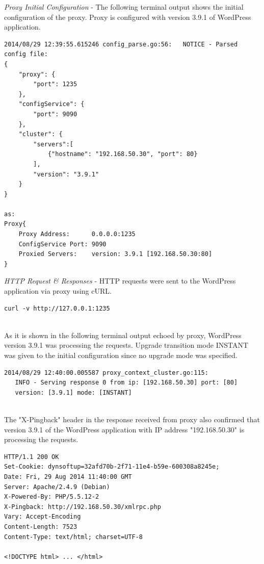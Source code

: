 \documentclass[a4paper,11pt,twoside]{report}
\begin{document}
\noindent
\textit{Proxy Initial Configuration} - The following terminal output shows the initial configuration of the proxy. Proxy is configured with version 3.9.1 of WordPress application.\smallskip

\begin{lstlisting}[language=terminal]
2014/08/29 12:39:55.615246 config_parse.go:56:   NOTICE - Parsed config file:
{
    "proxy": {
        "port": 1235
    },
    "configService": {
        "port": 9090
    },
    "cluster": {
        "servers":[
            {"hostname": "192.168.50.30", "port": 80}
        ],
        "version": "3.9.1"
    }
}

as:
Proxy{
    Proxy Address:      0.0.0.0:1235
    ConfigService Port: 9090
    Proxied Servers:    version: 3.9.1 [192.168.50.30:80]
}
\end{lstlisting}  

\noindent
\textit{HTTP Request \& Responses} - HTTP requests were sent to the WordPress application via proxy using cURL.
\begin{lstlisting}[language=terminal]
curl -v http://127.0.0.1:1235
\end{lstlisting}  

\noindent\\
As it is shown in the following terminal output echoed by proxy, WordPress version 3.9.1 was processing the requests. Upgrade transition mode INSTANT was given to the initial configuration since no upgrade mode was specified. \smallskip

\begin{lstlisting}[language=terminal]
2014/08/29 12:40:00.005587 proxy_context_cluster.go:115:     
   INFO - Serving response 0 from ip: [192.168.50.30] port: [80] 
   version: [3.9.1] mode: [INSTANT]
\end{lstlisting}  

\noindent\\
The "X-Pingback" header in the response received from proxy also confirmed that version 3.9.1 of the WordPress application with IP address "192.168.50.30" is processing the requests. \smallskip 

\begin{lstlisting}[language=terminal]
HTTP/1.1 200 OK
Set-Cookie: dynsoftup=32afd70b-2f71-11e4-b59e-600308a8245e;
Date: Fri, 29 Aug 2014 11:40:00 GMT
Server: Apache/2.4.9 (Debian)
X-Powered-By: PHP/5.5.12-2
X-Pingback: http://192.168.50.30/xmlrpc.php
Vary: Accept-Encoding
Content-Length: 7523
Content-Type: text/html; charset=UTF-8
 
<!DOCTYPE html> ... </html>
\end{lstlisting} 
\end{document}
